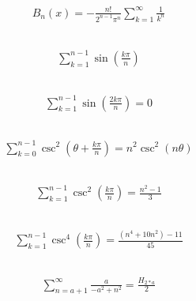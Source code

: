 \documentclass[12pt]{article}
\begin{document}
\subsection{}
\begin{align*}
B_{n}{\left(x \right)} = - \frac{n!}{2^{n - 1} \pi^{n}} \sum_{k=1}^{\infty} \frac{1}{k^{n}}
\end{align*}
\vspace{1cm}
\subsection{}
\begin{align*}
\sum_{k=1}^{n - 1} \sin{\left(\frac{k \pi}{n} \right)}
\end{align*}
\vspace{1cm}
\subsection{}
\begin{align*}
\sum_{k=1}^{n - 1} \sin{\left(\frac{2 k \pi}{n} \right)} = 0
\end{align*}
\vspace{1cm}
\subsection{}
\begin{align*}
\sum_{k=0}^{n - 1} \csc^{2}{\left(\theta + \frac{k \pi}{n} \right)} = n^{2} \csc^{2}{\left(n \theta \right)}
\end{align*}
\vspace{1cm}
\subsection{}
\begin{align*}
\sum_{k=1}^{n - 1} \csc^{2}{\left(\frac{k \pi}{n} \right)} = \frac{n^{2} - 1}{3}
\end{align*}
\vspace{1cm}
\subsection{}
\begin{align*}
\sum_{k=1}^{n - 1} \csc^{4}{\left(\frac{k \pi}{n} \right)} = \frac{\left(n^{4} + 10 n^{2}\right) - 11}{45}
\end{align*}
\vspace{1cm}
\subsection{}
\begin{align*}
\sum_{n=a + 1}^{\infty} \frac{a}{- a^{2} + n^{2}} = \frac{H_{2*a}}{2}
\end{align*}
\vspace{1cm}
\end{document}
